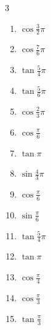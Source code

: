 \begin{multicols}{3}
\begin{enumerate}
  \item $\displaystyle \cos{\frac{3}{2}\pi}$
        \phantom{$\displaystyle =0$}

  \item $\displaystyle \cos{\frac{7}{6}\pi}$

  \item $\displaystyle \tan{\frac{5}{4}\pi}$
        \phantom{$\displaystyle =1$}

  \item $\displaystyle \tan{\frac{5}{6}\pi}$

  \item $\displaystyle \cos{\frac{2}{3}\pi}$

  \item $\displaystyle \cos{\frac{\pi}{6}}$

  \item $\displaystyle \tan{\pi}$
        \phantom{$\displaystyle =0$}

  \item $\displaystyle \sin{\frac{4}{3}\pi}$

  \item $\displaystyle \cos{\frac{\pi}{6}}$

  \item $\displaystyle \sin{\frac{\pi}{6}}$

  \item $\displaystyle \tan{\frac{5}{4}\pi}$
        \phantom{$\displaystyle =1$}

  \item $\displaystyle \tan{\pi}$
        \phantom{$\displaystyle =0$}

  \item $\displaystyle \cos{\frac{\pi}{4}}$

  \item $\displaystyle \cos{\frac{\pi}{3}}$

\columnbreak %

  \item $\displaystyle \tan{\frac{\pi}{3}}$


\end{enumerate}
\end{multicols}
